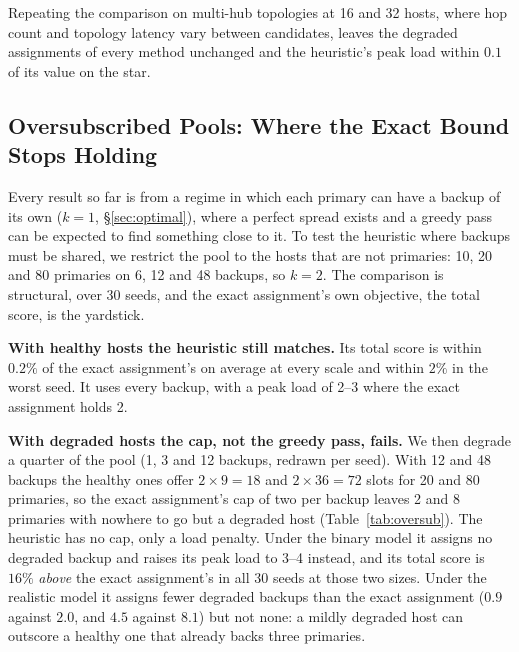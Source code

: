 Repeating the comparison on multi-hub topologies at 16 and 32 hosts, where hop
count and topology latency vary between candidates, leaves the degraded
assignments of every method unchanged and the heuristic's peak load within
$0.1$ of its value on the star.

\subsection{Oversubscribed Pools: Where the Exact Bound Stops Holding}
\label{sec:oversub}

Every result so far is from a regime in which each primary can have a backup of
its own ($k = 1$, \S\ref{sec:optimal}), where a perfect spread exists and a
greedy pass can be expected to find something close to it. To test the
heuristic where backups must be shared, we restrict the pool to the hosts that
are not primaries: 10, 20 and 80 primaries on 6, 12 and 48 backups, so $k = 2$.
The comparison is structural, over 30 seeds, and the exact assignment's own
objective, the total score, is the yardstick.

\textbf{With healthy hosts the heuristic still matches.} Its total score is
within $0.2\%$ of the exact assignment's on average at every scale and within
$2\%$ in the worst seed. It uses every backup, with a peak load of 2--3 where
the exact assignment holds 2.

\textbf{With degraded hosts the cap, not the greedy pass, fails.} We then
degrade a quarter of the pool (1, 3 and 12 backups, redrawn per seed). With 12
and 48 backups the healthy ones offer $2 \times 9 = 18$ and $2 \times 36 = 72$
slots for 20 and 80 primaries, so the exact assignment's cap of two per backup leaves 2 and 8
primaries with nowhere to go but a degraded host
(Table~\ref{tab:oversub}). The heuristic has no cap, only a load penalty. Under
the binary model it assigns no degraded backup and raises its peak load to 3--4
instead, and its total score is $16\%$ \emph{above} the exact assignment's in
all 30 seeds at those two sizes. Under the realistic model it assigns fewer degraded backups than
the exact assignment ($0.9$ against $2.0$, and $4.5$ against $8.1$) but not
none: a mildly degraded host can outscore a healthy one that already backs
three primaries.

